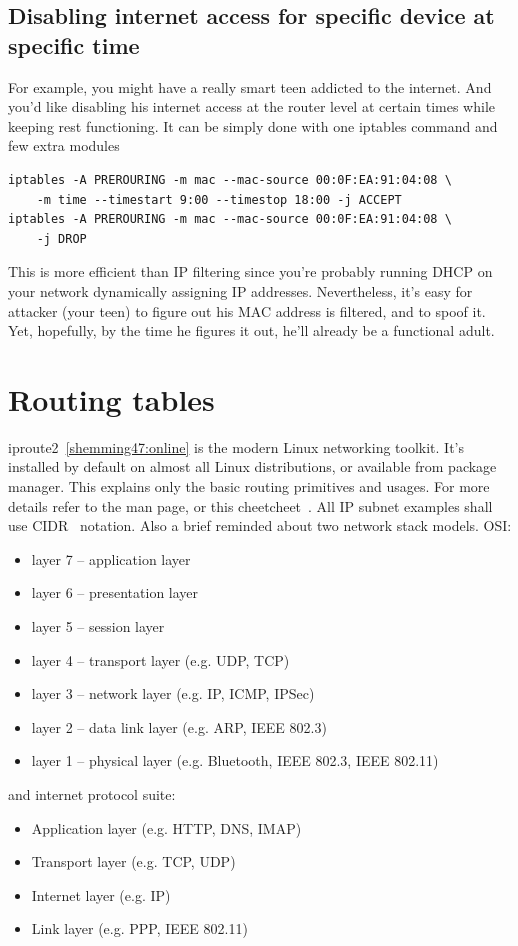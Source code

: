\documentclass[times, utf8, seminar, english]{fer}
\begin{document}
\section{Disabling internet access for specific device at specific time}

For example, you might have a really smart teen addicted to the internet.
And you'd like disabling his internet access at the router level at certain times while keeping rest functioning.
It can be simply done with one iptables command and few extra modules

\begin{verbatim}
iptables -A PREROURING -m mac --mac-source 00:0F:EA:91:04:08 \
    -m time --timestart 9:00 --timestop 18:00 -j ACCEPT
iptables -A PREROURING -m mac --mac-source 00:0F:EA:91:04:08 \
    -j DROP
\end{verbatim}

This is more efficient than IP filtering since you're probably running DHCP on your network dynamically assigning IP addresses.
Nevertheless, it's easy for attacker (your teen) to figure out his MAC address is filtered, and to spoof it.
Yet, hopefully, by the time he figures it out, he'll already be a functional adult.


\chapter{Routing tables}
iproute2~\ref{shemming47:online} is the modern Linux networking toolkit. It's installed by default on almost all Linux distributions, or available from package manager. This explains only the basic routing primitives and usages. For more details refer to the man page, or this cheetcheet~\cite{iproute285:online}. All IP subnet examples shall use CIDR~\cite{Classles63:online} notation. Also a brief reminded about two network stack models. OSI:
    \begin{itemize}
        \item layer 7 -- application layer
        \item layer 6 -- presentation layer
        \item layer 5 -- session layer
        \item layer 4 -- transport layer (e.g. UDP, TCP)
        \item layer 3 -- network layer (e.g. IP, ICMP, IPSec)
        \item layer 2 -- data link layer (e.g. ARP, IEEE 802.3)
        \item layer 1 -- physical layer (e.g. Bluetooth, IEEE 802.3, IEEE 802.11)
    \end{itemize}
    and internet protocol suite:
    \begin{itemize}
        \item Application layer (e.g. HTTP, DNS, IMAP)
        \item Transport layer (e.g. TCP, UDP)
        \item Internet layer (e.g. IP)
        \item Link layer (e.g. PPP, IEEE 802.11)
    \end{itemize}
\end{document}

